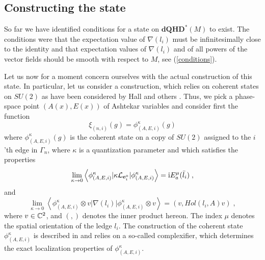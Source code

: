 \documentclass[12pt]{article}
\def\m{\mu}
\def\G{\Gamma}
\def\cl{{\cal L}}
\newcommand{\bbC}{{\Bbb C}}
\begin{document}
\subsection{Constructing the state}
\label{LarsL}

So far we have identified conditions for a state on $\mathbf{dQHD}^*(M)$ to exist. The conditions were that the expectation value of $\nabla(l_i)$ must be infinitesimally close to the identity and that expectation values of $\nabla(l_i)$ and of all powers of the vector fields should be smooth with respect to $M$, see (\ref{conditions}). 

Let us now for a moment concern ourselves with the actual construction of this state. In particular, let us consider a construction, which relies on coherent states on $SU(2)$ as have been considered by Hall \cite{H1,H2} and  others \cite{BT1,TW,BT2}. Thus, we pick a phase-space point $(A(x),E(x))$ of Ashtekar variables and consider first the function 
$$
\xi_{(n,i)}(g) = \phi^\kappa_{(A,E,i)}(g)
$$
where $\phi^\kappa_{(A,E,i)}(g)$ is the coherent state on a copy of $SU(2)$ assigned to the $i$'th edge in $\G_n$, where $\kappa$ is a quantization parameter and which satisfies the properties
\begin{equation}
 \lim_{\kappa \to 0}\left\langle   \phi^\kappa_{(A,E,i)} \vert \kappa \cl_{{\bf e}^a_i} \vert   \phi^\kappa_{(A,E,i)}  \right\rangle=   \mathrm{i}E_a^\m(\bar{l}_{i})\;,
 \label{JP1}
 \end{equation}
and
\begin{equation}
\lim_{\kappa \to 0}\left\langle  \phi^\kappa_{(A,E,i)}  \otimes v\vert \nabla(l_i) \vert \phi_{(A,E,i)}^\kappa\otimes v \right\rangle=(v,Hol(l_i,A)v)\;,
\label{JP2}
\end{equation}
where $v \in \bbC^2$, and $(,)$ denotes the inner product hereon. The index $\m$ denotes the spatial orientation of the ledge $l_i$.
%
The construction of the coherent state $\phi^\kappa_{(A,E,i)}$ is described in \cite{BT1,TW,BT2} and relies on a so-called complexifier, which determines the exact localization properties of $\phi^\kappa_{(A,E,i)}$. 
\end{document}
